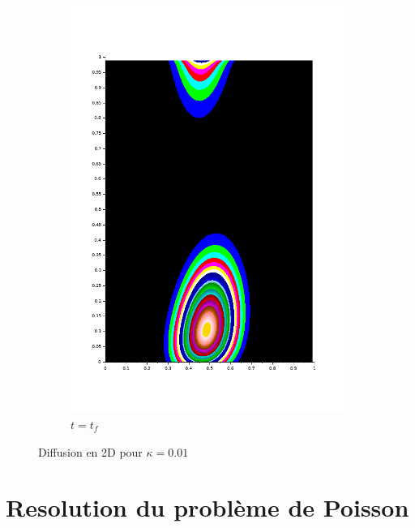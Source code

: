 \documentclass{article}
\begin{document}
\begin{figure}
\begin{subfigure}[b]{0.4\textwidth}
		\includegraphics[width=\textwidth]{conv-2D_kappa_0,01_f.png}
		\caption{$t=t_f$}
	\end{subfigure}
	\caption{Diffusion en 2D pour $\kappa=0.01$}\label{fig:diff2D}
\end{figure}



\section{Resolution du problème de Poisson}
\end{document}
